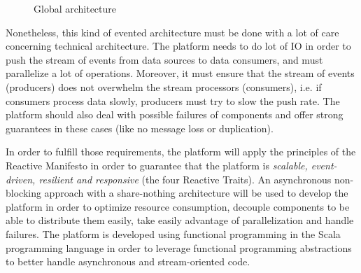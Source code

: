 \begin{figure}[h]
  \begin{center}
    \caption{Global architecture}
    \label{fig:main_archi}
  \end{center}
\end{figure}

Nonetheless, this kind of evented architecture must be done with a lot of care concerning technical architecture.
The platform needs to do lot of IO in order to push the stream of events from data sources to data consumers, and must
parallelize a lot of operations. Moreover, it must ensure that the stream of events (producers) does not overwhelm the stream
processors (consumers), i.e. if consumers process data slowly, producers must try to slow the push rate. The platform should also deal with possible
failures of components and offer strong guarantees in these cases (like no message loss or duplication).

In order to fulfill those requirements, the platform will apply the principles of the Reactive Manifesto  in order to guarantee
that the platform is \textit{scalable, event-driven, resilient and responsive} (the four Reactive Traits). An asynchronous non-blocking approach with a share-nothing architecture will be used to develop the platform in order to optimize resource consumption, decouple components to be able to distribute them easily, take easily advantage of parallelization and handle failures. 
The platform is developed using functional programming in the Scala programming language  in order to leverage functional programming abstractions to better handle asynchronous and stream-oriented code.
\\


